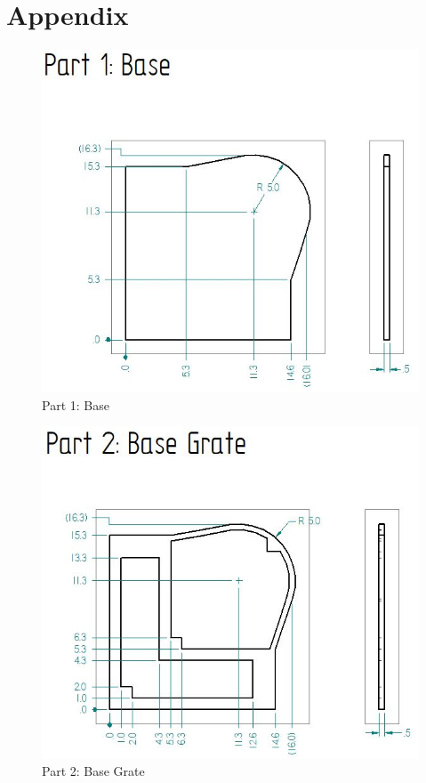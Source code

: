 \documentclass[12pt, titlepage]{article}
\begin{document}
\newpage{}

\section{Appendix}

\begin{figure}[H]
    \centerline{\includegraphics[scale=.5]{Part 1.jpg}}
    \caption{Part 1: Base}
    \label{fig}
\end{figure}

\begin{figure}[H]
    \centerline{\includegraphics[scale=.5]{Part 2.jpg}}
    \caption{Part 2: Base Grate}
    \label{fig}
\end{figure}
\end{document}
